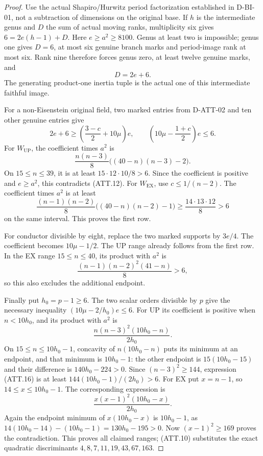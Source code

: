 \begin{proof}
Use the actual Shapiro/Hurwitz period factorization established
in D-BI-01, not a subtraction of dimensions on the original
base. If $h$ is the intermediate genus and $D$ the sum of
actual moving ranks, multiplicity six gives
$6=2e(h-1)+D$. Here $e\ge a^2\ge8100$.
Genus at least two is impossible; genus one gives $D=6$,
at most six genuine branch marks and period-image rank at
most six. Rank nine therefore forces genus zero, at least
twelve genuine marks, and
\[
                              D=2e+6.                       \tag{ATT.11}
\]
The generating product-one inertia tuple is the actual one
of this intermediate faithful image.

For a non-Eisenstein original field, two marked entries from
D-ATT-02 and ten other genuine entries give
\[
  2e+6\ge\left(\frac{3-c}{2}+10\mu\right)e,
  \qquad \left(10\mu-\frac{1+c}{2}\right)e\le6.             \tag{ATT.12}
\]
For $W_{\mathrm{UP}}$, the coefficient times $a^2$ is
\[
 \frac{n(n-3)}8\big((40-n)(n-3)-2\big).                    \tag{ATT.13}
\]
On $15\le n\le39$, it is at least
$15\cdot12\cdot10/8>6$. Since the coefficient is positive
and $e\ge a^2$, this contradicts (ATT.12).
For $W_{\mathrm{EX}}$, use $c\le1/(n-2)$. The coefficient
times $a^2$ is at least
\[
 \frac{(n-1)(n-2)}8\big((40-n)(n-2)-1\big)
       \ge\frac{14\cdot13\cdot12}{8}>6                   \tag{ATT.14}
\]
on the same interval. This proves the first row.

For conductor divisible by eight, replace the two marked
supports by $3e/4$. The coefficient becomes $10\mu-1/2$.
The UP range already follows from the first row. In the EX
range $15\le n\le40$, its product with $a^2$ is
\[
              \frac{(n-1)(n-2)^2(41-n)}8>6,                \tag{ATT.15}
\]
so this also excludes the additional endpoint.

Finally put $h_0=p-1\ge6$. The two scalar orders divisible
by $p$ give the necessary inequality
$(10\mu-2/h_0)e\le6$. For UP its coefficient is positive
when $n<10h_0$, and its product with $a^2$ is
\[
             \frac{n(n-3)^2(10h_0-n)}{2h_0}.              \tag{ATT.16}
\]
On $15\le n\le10h_0-1$, concavity of $n(10h_0-n)$
puts its minimum at an endpoint, and that minimum is
$10h_0-1$: the other endpoint is $15(10h_0-15)$ and
their difference is $140h_0-224>0$.
Since $(n-3)^2\ge144$, expression (ATT.16) is at least
$144(10h_0-1)/(2h_0)>6$.
For EX put $x=n-1$, so $14\le x\le10h_0-1$.
The corresponding expression is
\[
             \frac{x(x-1)^2(10h_0-x)}{2h_0}.              \tag{ATT.17}
\]
Again the endpoint minimum of $x(10h_0-x)$ is $10h_0-1$,
as $14(10h_0-14)-(10h_0-1)=130h_0-195>0$.
Now $(x-1)^2\ge169$ proves the contradiction. This proves
all claimed ranges; (ATT.10) substitutes the exact quadratic
discriminants $4,8,7,11,19,43,67,163$.
\end{proof}

